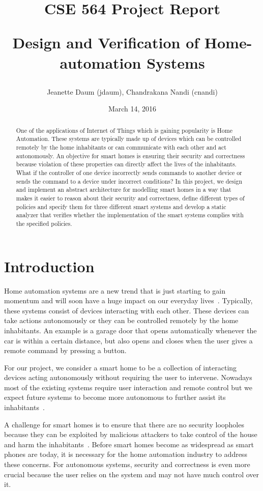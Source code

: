 \documentclass{article}
\title{\textbf{CSE 564 Project Report} 
\\
\begin{center}
\LARGE{Design and Verification of Home-automation Systems}
\end{center}\vspace{-2ex}}
\author{Jeanette Daum (jdaum), Chandrakana Nandi (cnandi) }
\date{March 14, 2016}
\begin{document}
\maketitle
\begin{abstract}
One of the applications of Internet of Things which is gaining popularity is Home Automation. These systems are typically made up of devices which can be controlled remotely by the home inhabitants or can communicate with each other and act autonomously. An objective for smart homes is ensuring their security and correctness because violation of these properties can directly affect the lives of the inhabitants. What if the controller of one device incorrectly sends commands to another device or sends the command to a device under incorrect conditions? In this project, we design and implement an abstract architecture for modelling smart homes in a way that makes it easier to reason about their security and correctness, define different types of policies and specify them for three different smart systems and develop a static analyzer that verifies whether the implementation of the smart systems complies with the specified policies. 

\end{abstract}
\section{Introduction}
Home automation systems are a new trend that is just starting to gain momentum and will soon have a huge impact on our everyday lives~\cite{samsung, homekit, echo, wink, homeos}. Typically, these systems consist of devices interacting with each other. These devices can take actions autonomously or they can be controlled remotely by the home inhabitants. An example is a garage door that opens automatically whenever the car is within a certain distance, but also opens and closes when the user gives a remote command by pressing a button. 

For our project, we consider a smart home to be a collection of interacting devices acting autonomously without requiring the user to intervene. Nowadays most of the existing systems require user interaction and remote control but we expect future systems to become more autonomous to further assist its inhabitants~\cite{homekit}.

A challenge for smart homes is to ensure that there are no security loopholes because they can be exploited by malicious attackers to take control of the house and harm the inhabitants~\cite{yoshi, jung}. Before smart homes become as widespread as smart phones are today, it is necessary for the home automation industry to address these concerns. For autonomous systems, security and correctness is even more crucial because the user relies on the system and may not have much control over it. 
\end{document}
